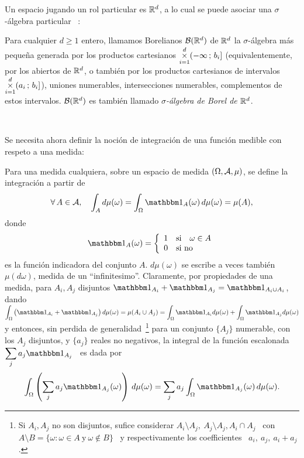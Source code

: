 Un espacio  jugando un rol particular es  $\mathbb{R}^d$, a lo cual  se puede asociar
una    $\sigma$-\'algebra    particular    ~\cite{AthLah06, Bog07:v1, Bog07:v2, Coh13}:
%
\begin{definicion}
  Para  cualquier  $d  \ge  1$  entero,  llamamos  Borelianos  $\mathcal{B}(\mathbb{R}^d)$  de
  $\mathbb{R}^d$  la $\sigma$-\'algebra  m\'as peque\~na  generada por  los productos
  cartesianos   $\displaystyle   \operatorname*{\times}_{i=1}^d  (-\infty   \,   ;  \,   b_i]$
  \big(equivalentemente,  por los  abiertos de  $\mathbb{R}^d$, o  tambi\'en  por los
  productos cartesianos de intervalos  $\displaystyle \operatorname*{\times}_{i=1}^d (a_i \, ;
  \, b_i]$\big), \ie uniones numerables, intersecciones numerables, complementos
  de    estos   intervalos.    $\mathcal{B}(\mathbb{R}^d)$    es   tambi\'en    llamado   {\it
    $\sigma$-\'algebra de Borel de $\mathbb{R}^d$}.
\end{definicion}

\

Se necesita ahora definir la  noci\'on de integraci\'on de una funci\'on medible
con respeto a una medida:
%
\begin{definicion}
  Para una medida  cualquiera, sobre un espacio de  medida $(\Omega,\mathcal{A},\mu)$, se
  define la integraci\'on a partir de
  \[
  \forall \, A \in \A,  \quad \int_A d\mu(\omega) = \int_\Omega \un_A(\omega) \,
  d\mu(\omega) = \mu(A),
  \]
  donde
  \[
  \un_A(\omega) = \left\{
  \begin{array}{clr}
  1 & \mbox{si} \quad \omega \in A\\
  0 & \mbox{si no}
  \end{array} \right.
  \]
  es  la funci\'on  indicadora del  conjunto $A$.   $d\mu(\omega)$ se  escribe a
  veces  tambi\'en $\mu(d\omega)$, medida  de un  ``infinitesimo''.  Claramente,
  por  propiedades  de una  medida,  para $  A_i,  A_j$  disjuntos $\un_{A_i}  +
  \un_{A_j}  =  \un_{A_i \cup  A_i}$,  dando  $\displaystyle \int_\Omega  \left(
    \un_{A_i} + \un_{A_j} \right) d\mu(\omega) = \mu(A_i \cup A_j) = \int_\Omega
  \un_{A_i} d\mu(\omega)  + \int_\Omega \un_{A_j} d\mu(\omega)$  y entonces, sin
  perdida  de  generalidad~\footnote{Si  $A_i,  A_j$ no  son  disjuntos,  sufice
    considerar $A_i\setminus A_j, \: A_j\setminus  A_j, A_i \cap A_j$ \ con $A
    \setminus B = \{ \omega: \omega \in  A \: \mbox{y} \: \omega \not\in B\}$ \
    y respectivamente los coefficientes \  $a_i, \: a_j, \: a_i +
    a_j$.}   para  un  conjunto  $\{  A_j  \}$  numerable,  con  los  $A_j$
  disjuntos, y $\{ a_j \}$ reales no negativos, la integral de la funci\'on
  escalonada \ $\displaystyle \sum_j a_j \un_{A_j}$ \ es dada por
  \[
  \int_\Omega \left( \sum_j a_j \un_{A_j}(\omega) \right) \, d\mu(\omega) =
  \sum_j a_j \int_\Omega \un_{A_j}(\omega) \, d\mu(\omega).
  \]
\end{definicion}



